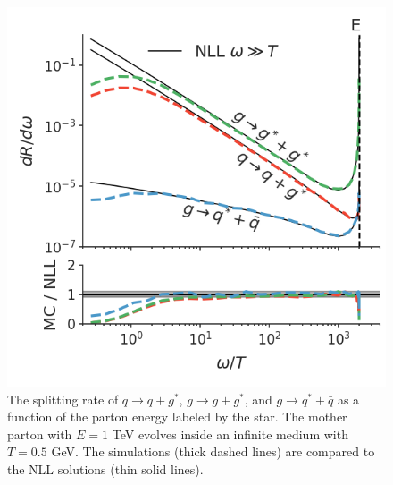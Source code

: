 \documentclass[aps, prc, reprint, amsmath, groupedaddress, nofootinbib]{revtex4-1}
\begin{document}
\begin{figure}
\includegraphics[width=\columnwidth]{channel_rate.png}
\caption{The splitting rate of $q\rightarrow q+g^*$, $g\rightarrow g+g^*$, and $g\rightarrow q^* + \bar{q}$ as a function of the parton energy labeled by the star. The mother parton with $E=1$ TeV evolves inside an infinite medium with $T=0.5$ GeV. The simulations (thick dashed lines) are compared to the NLL solutions (thin solid lines).}
\label{fig:channel_rate}
\end{figure}
\end{document}
